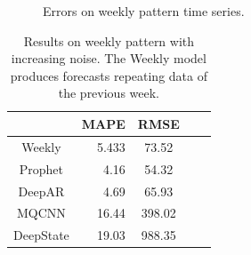 \documentclass[a4paper, 12pt]{article} %
\newcommand{\ra}[1]{\renewcommand{\arraystretch}{#1}}
\begin{document}
	\begin{figure}\centering
		 \hfill
		
		\caption{Errors on weekly pattern time series.}
		\label{fig:results_forecasting_weekly}
	\end{figure}
	
	\begin{table}\centering 
		\ra{1.3}
		\begin{tabular}{@{}crcrc@{}}
			\midrule
			& MAPE & RMSE\\
			\midrule
			Weekly & 5.433 & 73.52\\
			Prophet & 4.16 & 54.32\\
			DeepAR & 4.69 & 65.93\\
			MQCNN & 16.44 & 398.02\\
			DeepState & 19.03 & 988.35\\
			\bottomrule
		\end{tabular}
		\caption{Results on weekly pattern with increasing noise. The Weekly model produces forecasts repeating data of the previous week.} \label{table:results_forecasting_weekly}
	\end{table}
\end{document}
